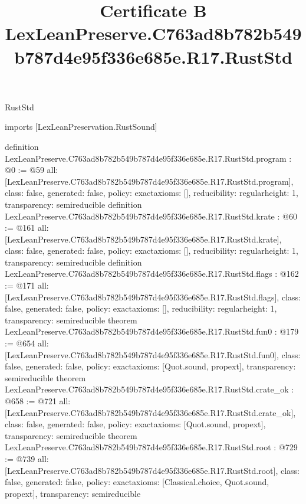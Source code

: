 \begin{lexlean}{RustStd}
\title{Certificate B LexLeanPreserve.C763ad8b782b549b787d4e95f336e685e.R17.RustStd}
\begin{coremodule}
imports [LexLeanPreservation.RustSound]

definition LexLeanPreserve.C763ad8b782b549b787d4e95f336e685e.R17.RustStd.program : @0 := @59 {
  all: [LexLeanPreserve.C763ad8b782b549b787d4e95f336e685e.R17.RustStd.program],
  class: false,
  generated: false,
  policy: exact{axioms: []},
  reducibility: regular{height: 1},
  transparency: semireducible
}
definition LexLeanPreserve.C763ad8b782b549b787d4e95f336e685e.R17.RustStd.krate : @60 := @161 {
  all: [LexLeanPreserve.C763ad8b782b549b787d4e95f336e685e.R17.RustStd.krate],
  class: false,
  generated: false,
  policy: exact{axioms: []},
  reducibility: regular{height: 1},
  transparency: semireducible
}
definition LexLeanPreserve.C763ad8b782b549b787d4e95f336e685e.R17.RustStd.flags : @162 := @171 {
  all: [LexLeanPreserve.C763ad8b782b549b787d4e95f336e685e.R17.RustStd.flags],
  class: false,
  generated: false,
  policy: exact{axioms: []},
  reducibility: regular{height: 1},
  transparency: semireducible
}
theorem LexLeanPreserve.C763ad8b782b549b787d4e95f336e685e.R17.RustStd.fun0 : @179 := @654 {
  all: [LexLeanPreserve.C763ad8b782b549b787d4e95f336e685e.R17.RustStd.fun0],
  class: false,
  generated: false,
  policy: exact{axioms: [Quot.sound, propext]},
  transparency: semireducible
}
theorem LexLeanPreserve.C763ad8b782b549b787d4e95f336e685e.R17.RustStd.crate_ok : @658 := @721 {
  all: [LexLeanPreserve.C763ad8b782b549b787d4e95f336e685e.R17.RustStd.crate_ok],
  class: false,
  generated: false,
  policy: exact{axioms: [Quot.sound, propext]},
  transparency: semireducible
}
theorem LexLeanPreserve.C763ad8b782b549b787d4e95f336e685e.R17.RustStd.root : @729 := @739 {
  all: [LexLeanPreserve.C763ad8b782b549b787d4e95f336e685e.R17.RustStd.root],
  class: false,
  generated: false,
  policy: exact{axioms: [Classical.choice, Quot.sound, propext]},
  transparency: semireducible
}


\end{coremodule}
\end{lexlean}
